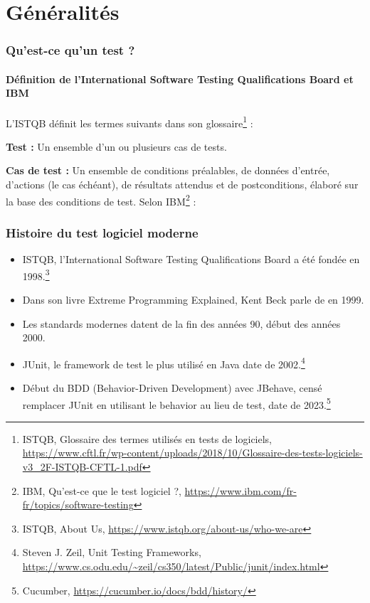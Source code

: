 \documentclass{beamer}
\begin{document}
    \section{Généralités}
    \begin{frame}
        \frametitle{Qu’est-ce qu’un test ?}
        \framesubtitle{Définition de l'International Software Testing Qualifications Board et IBM}
        \transdissolve
        L’ISTQB définit les termes suivants dans son glossaire\footnote{ISTQB, Glossaire des termes utilisés en tests de logiciels, \url{https://www.cftl.fr/wp-content/uploads/2018/10/Glossaire-des-tests-logiciels-v3_2F-ISTQB-CFTL-1.pdf}} :

        \textbf{Test :} Un ensemble d’un ou plusieurs cas
        de tests.

        \textbf{Cas de test :} Un ensemble de conditions
        préalables, de données d'entrée, d'actions
        (le cas échéant), de résultats attendus et
        de postconditions, élaboré sur la base des
        conditions de test.
        \bigbreak
        Selon IBM\footnote{IBM, Qu'est-ce que le test logiciel ?, \url{https://www.ibm.com/fr-fr/topics/software-testing}} :

    \end{frame}

    \begin{frame}
        \frametitle{Histoire du test logiciel moderne}
        \transdissolve
        \begin{itemize}
            \item ISTQB, l’International Software Testing Qualifications Board a été fondée en 1998.\footnote{ISTQB, About Us, \url{https://www.istqb.org/about-us/who-we-are}}

            \item Dans son livre Extreme Programming Explained, Kent Beck parle de  en 1999.

            \item Les standards modernes datent de la fin des années 90, début des années 2000.

            \item JUnit, le framework de test le plus utilisé en Java date de 2002.\footnote{Steven J. Zeil, Unit Testing Frameworks, \url{https://www.cs.odu.edu/~zeil/cs350/latest/Public/junit/index.html}}

            \item Début du BDD (Behavior-Driven Development) avec JBehave, censé remplacer JUnit en utilisant le behavior au lieu de test, date de 2023.\footnote{Cucumber, \url{https://cucumber.io/docs/bdd/history/}}
        \end{itemize}
    \end{frame}
\end{document}
